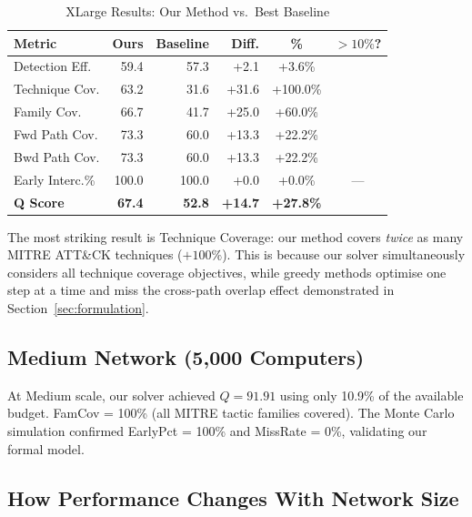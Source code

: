 \documentclass[journal]{IEEEtran}
\newcommand{\cmark}{\ding{51}}
\begin{document}
\begin{table}[htbp]
\caption{XLarge Results: Our Method vs.\ Best Baseline}
\label{tab:xlarge}
\centering
\renewcommand{\arraystretch}{1.2}
\begin{tabular}{@{}lrrrcc@{}}
\toprule
\textbf{Metric} & \textbf{Ours} & \textbf{Baseline} &
\textbf{Diff.} & \textbf{\%} & \textbf{$>10\%$?} \\
\midrule
Detection Eff.  & 59.4  & 57.3  & +2.1  & +3.6\%   & \cmark \\
Technique Cov.  & 63.2  & 31.6  & +31.6 & +100.0\% & \cmark \\
Family Cov.     & 66.7  & 41.7  & +25.0 & +60.0\%  & \cmark \\
Fwd Path Cov.   & 73.3  & 60.0  & +13.3 & +22.2\%  & \cmark \\
Bwd Path Cov.   & 73.3  & 60.0  & +13.3 & +22.2\%  & \cmark \\
Early Interc.\% & 100.0 & 100.0 & +0.0  & +0.0\%   & ---    \\
\midrule
\textbf{Q Score}& \textbf{67.4} & \textbf{52.8} &
  \textbf{+14.7} & \textbf{+27.8\%} & \cmark \\
\bottomrule
\end{tabular}
\end{table}

The most striking result is Technique Coverage: our method
covers \emph{twice} as many MITRE ATT\&CK techniques
($+100\%$).
This is because our solver simultaneously considers all
technique coverage objectives, while greedy methods optimise
one step at a time and miss the cross-path overlap effect
demonstrated in Section~\ref{sec:formulation}.

\subsection{Medium Network (5,000 Computers)}

At Medium scale, our solver achieved $Q = 91.91$ using only
10.9\% of the available budget.
FamCov = 100\% (all MITRE tactic families covered).
The Monte Carlo simulation confirmed EarlyPct = 100\%
and MissRate = 0\%, validating our formal model.

\subsection{How Performance Changes With Network Size}
\end{document}
